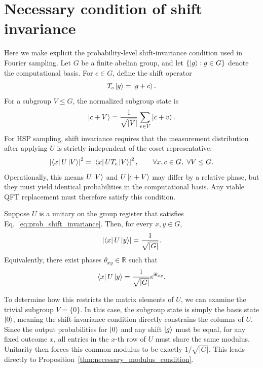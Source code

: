 \section{Necessary condition of shift invariance}
\label{app:necessary condition of sinv}
Here we make explicit the probability-level shift-invariance condition used in Fourier sampling.
Let $G$ be a finite abelian group, and let $\{\ket{g}:g\in G\}$ denote the computational basis.
For $c\in G$, define the shift operator
\begin{equation}
    T_c\ket{g}=\ket{g+c}.
\end{equation}
For a subgroup $V\le G$, the normalized subgroup state is
\begin{equation}
    \ket{c + V}=\frac{1}{\sqrt{|V|}}\sum_{v\in V}\ket{c + v}.
\end{equation}
For HSP sampling, shift invariance requires that the measurement distribution after applying $U$ is strictly independent of the coset representative:
\begin{equation}
    \left|\bra{x}U\ket{V}\right|^2
    =
    \left|\bra{x}U T_c\ket{V}\right|^2,
    \qquad
    \forall x,c\in G,\ \forall V\le G.
    \label{eq:prob_shift_invariance}
\end{equation}
Operationally, this means $U\ket{V}$ and $U\ket{c+V}$ may differ by a relative phase, but they must yield identical probabilities in the computational basis. Any viable QFT replacement must therefore satisfy this condition.
\begin{restatedproposition}
    Suppose $U$ is a unitary on the group register that satisfies Eq.~\eqref{eq:prob_shift_invariance}. Then, for every $x,y\in G$,
    \begin{equation}
        \left|\bra{x}U\ket{y}\right|=\frac{1}{\sqrt{|G|}}.
    \end{equation}
    Equivalently, there exist phases $\theta_{xy}\in\mathbb{R}$ such that
    \begin{equation}
        \bra{x}U\ket{y}=\frac{1}{\sqrt{|G|}}e^{\mathsf{i}\theta_{xy}}.
    \end{equation}
\end{restatedproposition}
To determine how this restricts the matrix elements of $U$, we can examine the trivial subgroup $V=\{0\}$. In this case, the subgroup state is simply the basis state $\ket{0}$, meaning the shift-invariance condition directly constrains the columns of $U$. Since the output probabilities for $\ket{0}$ and any shift $\ket{g}$ must be equal, for any fixed outcome $x$, all entries in the $x$-th row of $U$ must share the same modulus. Unitarity then forces this common modulus to be exactly $1/\sqrt{|G|}$. This leads directly to Proposition~\ref{thm:necessary_modulus_condition}.



